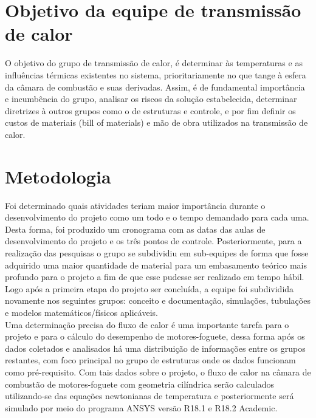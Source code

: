 

\section{Objetivo da equipe de transmissão de calor}
O objetivo do grupo de transmissão de calor, é determinar às temperaturas e as influências térmicas existentes no sistema, prioritariamente no que tange à esfera da câmara de combustão e suas derivadas. Assim, é de fundamental importância e incumbência do grupo, analisar os riscos da solução estabelecida, determinar diretrizes à outros grupos como o de estruturas e controle, e por fim definir os custos de materiais (bill of materials) e mão de obra utilizados na transmissão de calor.
\section{Metodologia}
Foi determinado quais atividades teriam maior importância durante o desenvolvimento do projeto como um todo e o tempo demandado para cada uma. Desta forma, foi produzido um cronograma com as datas das aulas de desenvolvimento do projeto e os três pontos de controle. Posteriormente, para a realização das pesquisas o grupo se subdividiu em sub-equipes de forma que fosse adquirido uma maior quantidade de material para um embasamento teórico mais profundo para o projeto a fim de que esse pudesse ser realizado em tempo hábil. Logo após a primeira etapa do projeto ser concluída, a equipe foi subdividida novamente nos seguintes grupos: conceito e documentação, simulações, tubulações e modelos matemáticos/físicos aplicáveis.\\
Uma determinação precisa do fluxo de calor é uma importante tarefa para o projeto e para o cálculo do desempenho de motores-foguete, dessa forma após os dados coletados e analisados há uma distribuição de informações entre os grupos restantes, com foco principal no grupo de estruturas onde os dados funcionam como pré-requisito. Com tais dados sobre o projeto, o fluxo de calor na câmara de combustão de motores-foguete com geometria cilíndrica serão calculados utilizando-se das equações newtonianas de temperatura e posteriormente será simulado por meio do programa ANSYS versão R18.1 e  R18.2 Academic. 

